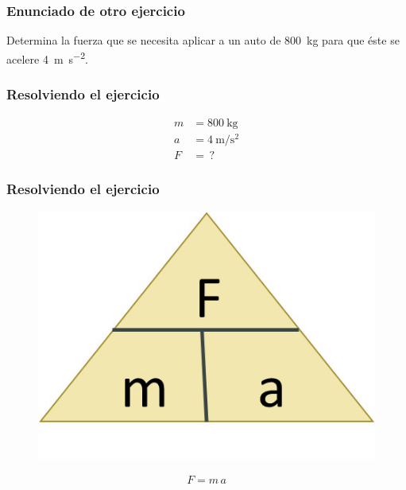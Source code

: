 \documentclass[14pt]{beamer}
\begin{document}
\begin{frame}
\frametitle{Enunciado de otro ejercicio}
Determina la fuerza que se necesita aplicar a un auto de \SI{800}{\kilo\gram} para que éste se acelere \SI{4}{\meter\per\square\second}.
\end{frame}
\begin{frame}
\frametitle{Resolviendo el ejercicio}
\pause
\begin{align*}
m &= \SI{800}{\kilo\gram} \\[0.5em]
a &= \SI{4}{\meter\per\square\second} \\[0.5em]
F &= \, ?
\end{align*}
\end{frame}
\begin{frame}
\frametitle{Resolviendo el ejercicio}
\pause
\begin{figure}
    \centering
    \includegraphics[scale=1]{Imagenes/Newton_11.jpg}
\end{figure}
\pause
\begin{align*}
F = m \, a
\end{align*}
\end{frame}
\end{document}

